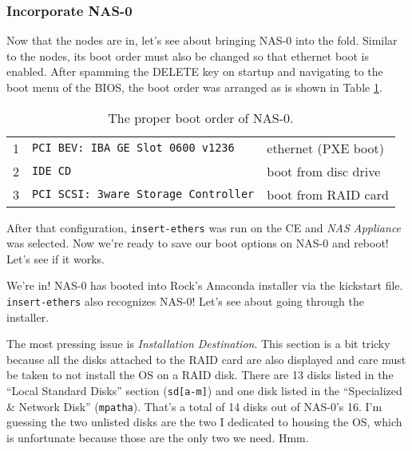 \documentclass[12pt]{article}
\begin{document}
%

\subsubsection{Incorporate NAS-0}

\qq Now that the nodes are in, let's see about bringing NAS-0 into the
fold. Similar to the nodes, its boot order must also be changed so that
ethernet boot is enabled. After spamming the DELETE key on startup and
navigating to the boot menu of the BIOS, the boot order was arranged as is shown
in Table \ref{tab:bootOrderNAS0}.

\begin{table}[H]
  \caption{The proper boot order of NAS-0.}
  \begin{center}
    \begin{tabular}{|l|l|l|}
      \hline
      1 & {\tt PCI BEV: IBA GE Slot 0600 v1236} & ethernet (PXE boot) \\
      2 & {\tt IDE CD} & boot from disc drive \\
      3 & {\tt PCI SCSI: 3ware Storage Controller} & boot from RAID card \\
      \hline
    \end{tabular}
  \end{center}
  \label{tab:bootOrderNAS0}
\end{table}


\qq After that configuration, {\tt insert-ethers} was run on the CE and
\textit{NAS Appliance} was selected. Now we're ready to save our boot options on
NAS-0 and reboot! Let's see if it works.

\qq We're in! NAS-0 has booted into Rock's Anaconda installer via the kickstart
file. {\tt insert-ethers} also recognizes NAS-0! Let's see about going through
the installer.

\qq The most pressing issue is \textit{Installation Destination}. This section
is a bit tricky because all the disks attached to the RAID card are also
displayed and care must be taken to not install the OS on a RAID disk. There are
13 disks listed in the ``Local Standard Disks'' section ({\tt sd[a-m]}) and one
disk listed in the ``Specialized \& Network Disk'' ({\tt mpatha}). That's a
total of 14 disks out of NAS-0's 16. I'm guessing the two unlisted disks are the
two I dedicated to housing the OS, which is unfortunate because those are the
only two we need. Hmm.
\end{document}
